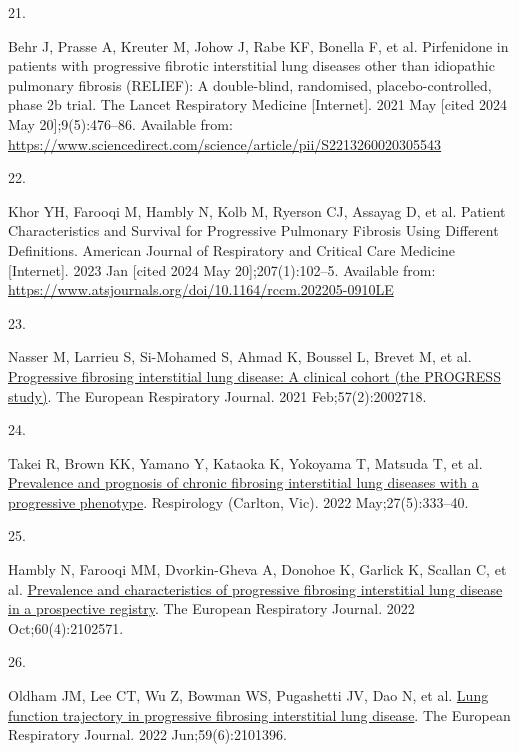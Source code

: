 \documentclass[
]{article}
\newlength{\cslhangindent}
\newlength{\csllabelwidth}
\newenvironment{CSLReferences}[2] %
 {\begin{list}{}{%
  \setlength{\itemindent}{0pt}
  \setlength{\leftmargin}{0pt}
  \setlength{\parsep}{0pt}
  \ifodd #1
   \setlength{\leftmargin}{\cslhangindent}
   \setlength{\itemindent}{-1\cslhangindent}
  \fi
  \setlength{\itemsep}{#2\baselineskip}}}
 {\end{list}}
\newcommand{\CSLLeftMargin}[1]{\parbox[t]{\csllabelwidth}{\strut#1\strut}}
\newcommand{\CSLRightInline}[1]{\parbox[t]{\linewidth - \csllabelwidth}{\strut#1\strut}}
\begin{document}
\begin{CSLReferences}{0}{1}
\CSLLeftMargin{21. }%
\CSLRightInline{Behr J, Prasse A, Kreuter M, Johow J, Rabe KF, Bonella F, et al. Pirfenidone in patients with progressive fibrotic interstitial lung diseases other than idiopathic pulmonary fibrosis ({RELIEF}): A double-blind, randomised, placebo-controlled, phase 2b trial. The Lancet Respiratory Medicine {[}Internet{]}. 2021 May {[}cited 2024 May 20{]};9(5):476--86. Available from: \url{https://www.sciencedirect.com/science/article/pii/S2213260020305543}}

\CSLLeftMargin{22. }%
\CSLRightInline{Khor YH, Farooqi M, Hambly N, Kolb M, Ryerson CJ, Assayag D, et al. Patient {Characteristics} and {Survival} for {Progressive} {Pulmonary} {Fibrosis} {Using} {Different} {Definitions}. American Journal of Respiratory and Critical Care Medicine {[}Internet{]}. 2023 Jan {[}cited 2024 May 20{]};207(1):102--5. Available from: \url{https://www.atsjournals.org/doi/10.1164/rccm.202205-0910LE}}

\CSLLeftMargin{23. }%
\CSLRightInline{Nasser M, Larrieu S, Si-Mohamed S, Ahmad K, Boussel L, Brevet M, et al. \href{https://doi.org/10.1183/13993003.02718-2020}{Progressive fibrosing interstitial lung disease: A clinical cohort (the {PROGRESS} study)}. The European Respiratory Journal. 2021 Feb;57(2):2002718. }

\CSLLeftMargin{24. }%
\CSLRightInline{Takei R, Brown KK, Yamano Y, Kataoka K, Yokoyama T, Matsuda T, et al. \href{https://doi.org/10.1111/resp.14245}{Prevalence and prognosis of chronic fibrosing interstitial lung diseases with a progressive phenotype}. Respirology (Carlton, Vic). 2022 May;27(5):333--40. }

\CSLLeftMargin{25. }%
\CSLRightInline{Hambly N, Farooqi MM, Dvorkin-Gheva A, Donohoe K, Garlick K, Scallan C, et al. \href{https://doi.org/10.1183/13993003.02571-2021}{Prevalence and characteristics of progressive fibrosing interstitial lung disease in a prospective registry}. The European Respiratory Journal. 2022 Oct;60(4):2102571. }

\CSLLeftMargin{26. }%
\CSLRightInline{Oldham JM, Lee CT, Wu Z, Bowman WS, Pugashetti JV, Dao N, et al. \href{https://doi.org/10.1183/13993003.01396-2021}{Lung function trajectory in progressive fibrosing interstitial lung disease}. The European Respiratory Journal. 2022 Jun;59(6):2101396. }


\end{CSLReferences}
\end{document}
